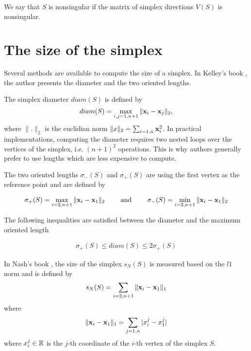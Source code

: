 We say that $S$ is nonsingular if the matrix of simplex directions $V(S)$ is nonsingular.


\section{The size of the simplex}

Several methods are available to compute the size of a simplex.
In Kelley's book \cite{Kelley1999}, the author presents the diameter and the two oriented lengths.

The simplex diameter $diam(S)$ is defined by 
\begin{eqnarray}
\label{simplex-diameter}
diam(S) = \max_{i,j=1,n+1} \|\mathbf{x}_i - \mathbf{x}_j\|_2,
\end{eqnarray}
where $\|.\|_2$ is the euclidian norm $\|x\|_2 = \sum_{i=1,n}\mathbf{x}_i^2$.
In practical implementations, computing the diameter requires two nested loops over the 
vertices of the simplex, i.e. $(n+1)^2$ operations. This is why authors generally 
prefer to use lengths which are less expensive to compute.

The two oriented lengths $\sigma_-(S)$ and $\sigma_+(S)$ are using the 
first vertex as the reference point and are defined by 

\begin{eqnarray}
\label{simplex-sigma}
\sigma_+(S) = \max_{i=2,n+1} \|\mathbf{x}_i - \mathbf{x}_1\|_2 \qquad \textrm { and } \qquad \sigma_-(S) = \min_{i=2,n+1} \|\mathbf{x}_i - \mathbf{x}_1\|_2
\end{eqnarray}

The following inequalities are satisfied between the diameter and the maximum oriented length

\begin{eqnarray}
\label{simplex-sigma-diam}
\sigma_+(S) \leq diam(S) \leq 2 \sigma_+(S)
\end{eqnarray}

In Nash's book \cite{nla.cat-vn1060620}, the size of the simplex $s_N(S)$ is measured
based on the $l1$ norm and is defined by 
\begin{eqnarray}
\label{simplex-sizenash}
s_N(S) = \sum_{i=2,n+1} \|\mathbf{x}_i - \mathbf{x}_1\|_1
\end{eqnarray}
where 
\begin{eqnarray}
\label{simplex-sizenash2}
\|\mathbf{x}_i - \mathbf{x}_1\|_1 = \sum_{j=1,n} |x_i^j - x_1^j|
\end{eqnarray}
where $x_i^j\in\mathbb{R}$ is the $j$-th coordinate of the $i$-th vertex of the simplex $S$.

